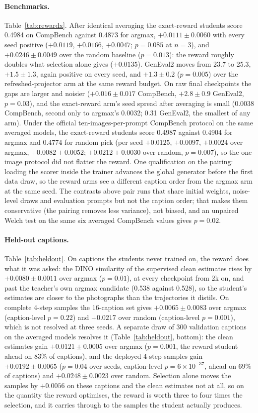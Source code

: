 \documentclass[11pt,a4paper]{article}
\begin{document}
\paragraph{Benchmarks.}
Table~\ref{tab:rewardx}. After identical averaging the exact-reward students score 0.4984 on CompBench against 0.4873 for argmax, $+0.0111\pm0.0060$ with every seed positive ($+0.0119$, $+0.0166$, $+0.0047$; $p=0.085$ at $n=3$), and $+0.0246\pm0.0049$ over the random baseline ($p=0.013$): the reward roughly doubles what selection alone gives ($+0.0135$). GenEval2 moves from 23.7 to 25.3, $+1.5\pm1.3$, again positive on every seed, and $+1.3\pm0.2$ ($p=0.005$) over the refreshed-projector arm at the same reward budget. On raw final checkpoints the gaps are larger and noisier ($+0.016\pm0.017$ CompBench, $+2.8\pm0.9$ GenEval2, $p=0.03$), and the exact-reward arm's seed spread after averaging is small (0.0038 CompBench, second only to argmax's 0.0032; 0.31 GenEval2, the smallest of any arm). Under the official ten-images-per-prompt CompBench protocol on the same averaged models, the exact-reward students score 0.4987 against 0.4904 for argmax and 0.4774 for random pick (per seed $+0.0125$, $+0.0097$, $+0.0024$ over argmax, $+0.0082\pm0.0052$; $+0.0212\pm0.0030$ over random, $p=0.007$), so the one-image protocol did not flatter the reward. One qualification on the pairing: loading the scorer inside the trainer advances the global generator before the first data draw, so the reward arms see a different caption order from the argmax arm at the same seed. The contrasts above pair runs that share initial weights, noise-level draws and evaluation prompts but not the caption order; that makes them conservative (the pairing removes less variance), not biased, and an unpaired Welch test on the same six averaged CompBench values gives $p=0.02$.

\paragraph{Held-out captions.}
Table~\ref{tab:heldout}. On captions the students never trained on, the reward does what it was asked: the DINO similarity of the supervised clean estimates rises by $+0.0080\pm0.0011$ over argmax ($p=0.01$), at every checkpoint from 2k on, and past the teacher's own argmax candidate (0.538 against 0.528), so the student's estimates are closer to the photographs than the trajectories it distils. On complete 4-step samples the 16-caption set gives $+0.0065\pm0.0083$ over argmax (caption-level $p=0.22$) and $+0.0217$ over random (caption-level $p=0.001$), which is not resolved at three seeds. A separate draw of 300 validation captions on the averaged models resolves it (Table~\ref{tab:heldout}, bottom): the clean estimates gain $+0.0121\pm0.0005$ over argmax ($p=0.001$, the reward student ahead on 83\% of captions), and the deployed 4-step samples gain $+0.0192\pm0.0065$ ($p=0.04$ over seeds, caption-level $p=6\times10^{-37}$, ahead on 69\% of captions) and $+0.0248\pm0.0023$ over random. Selection alone moves the samples by $+0.0056$ on these captions and the clean estimates not at all, so on the quantity the reward optimises, the reward is worth three to four times the selection, and it carries through to the samples the student actually produces.
\end{document}

